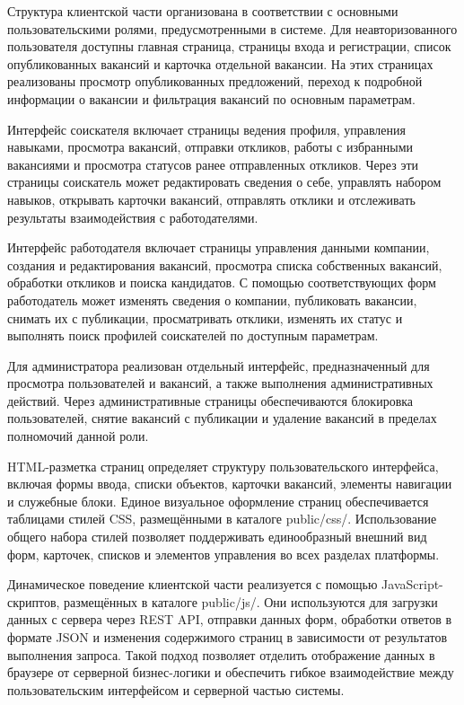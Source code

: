Структура клиентской части организована в соответствии с основными пользовательскими ролями, предусмотренными в системе. Для неавторизованного пользователя доступны главная страница, страницы входа и регистрации, список опубликованных вакансий и карточка отдельной вакансии. На этих страницах реализованы просмотр опубликованных предложений, переход к подробной информации о вакансии и фильтрация вакансий по основным параметрам.

Интерфейс соискателя включает страницы ведения профиля, управления навыками, просмотра вакансий, отправки откликов, работы с избранными вакансиями и просмотра статусов ранее отправленных откликов. Через эти страницы соискатель может редактировать сведения о себе, управлять набором навыков, открывать карточки вакансий, отправлять отклики и отслеживать результаты взаимодействия с работодателями.

Интерфейс работодателя включает страницы управления данными компании, создания и редактирования вакансий, просмотра списка собственных вакансий, обработки откликов и поиска кандидатов. С помощью соответствующих форм работодатель может изменять сведения о компании, публиковать вакансии, снимать их с публикации, просматривать отклики, изменять их статус и выполнять поиск профилей соискателей по доступным параметрам.

Для администратора реализован отдельный интерфейс, предназначенный для просмотра пользователей и вакансий, а также выполнения административных действий. Через административные страницы обеспечиваются блокировка пользователей, снятие вакансий с публикации и удаление вакансий в пределах полномочий данной роли.

HTML-разметка страниц определяет структуру пользовательского интерфейса, включая формы ввода, списки объектов, карточки вакансий, элементы навигации и служебные блоки. Единое визуальное оформление страниц обеспечивается таблицами стилей CSS, размещёнными в каталоге public/css/. Использование общего набора стилей позволяет поддерживать единообразный внешний вид форм, карточек, списков и элементов управления во всех разделах платформы.

Динамическое поведение клиентской части реализуется с помощью JavaScript-скриптов, размещённых в каталоге public/js/. Они используются для загрузки данных с сервера через REST API, отправки данных форм, обработки ответов в формате JSON и изменения содержимого страниц в зависимости от результатов выполнения запроса. Такой подход позволяет отделить отображение данных в браузере от серверной бизнес-логики и обеспечить гибкое взаимодействие между пользовательским интерфейсом и серверной частью системы.

